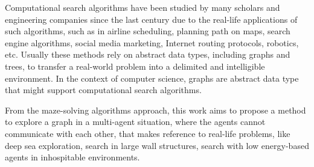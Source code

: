Computational search algorithms have been studied by many scholars and engineering companies since the last century due to the real-life applications of such algorithms, such as in airline scheduling, planning path on maps, search engine algorithms, social media marketing, Internet routing protocols, robotics, etc. Usually these methods rely on abstract data types, including graphs and trees, to transfer a real-world problem into a delimited and intelligible environment. In the context of computer science, graphs are abstract data type that might support computational search algorithms. 

From the maze-solving algorithms approach, this work aims to propose a method to explore a graph in a multi-agent situation, where the agents cannot communicate with each other, that makes reference to real-life problems, like deep sea exploration, search in large wall structures, search with low energy-based agents in inhospitable environments. 
